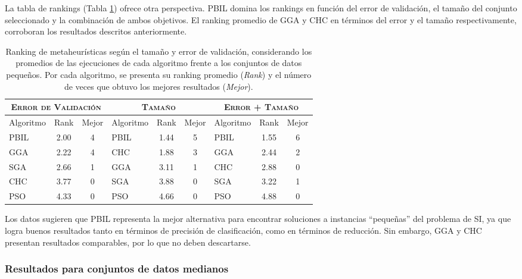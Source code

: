 La tabla de rankings (Tabla \ref{res-small-rank}) ofrece otra perspectiva. PBIL domina los rankings en función del error de validación, el tamaño del conjunto seleccionado y la combinación de ambos objetivos. El ranking promedio de GGA y CHC en términos del error y el tamaño respectivamente, corroboran los resultados descritos anteriormente.

\begin{table}[h!]
\centering
\begin{tabular}{l c c|l c c|l c c}
\hline
\multicolumn{3}{c|}{\textsc{Error de Validación}}
	& \multicolumn{3}{c|}{\textsc{Tamaño}}
	& \multicolumn{3}{c}{\textsc{Error + Tamaño}} \\
\hline
Algoritmo & Rank & Mejor & Algoritmo & Rank & Mejor & Algoritmo & Rank & Mejor \\
\hline
\hline
PBIL & 2.00 & 4 & PBIL & 1.44 & 5 & PBIL & 1.55 & 6 \\
GGA  & 2.22 & 4 & CHC  & 1.88 & 3 & GGA  & 2.44 & 2 \\
SGA  & 2.66 & 1 & GGA  & 3.11 & 1 & CHC  & 2.88 & 0 \\
CHC  & 3.77 & 0 & SGA  & 3.88 & 0 & SGA  & 3.22 & 1 \\
PSO  & 4.33 & 0 & PSO  & 4.66 & 0 & PSO  & 4.88 & 0 \\
\hline
\end{tabular}
\caption[Ranking de metaheurísticas usando conjuntos de datos pequeños]{Ranking de metaheurísticas según el tamaño y error de validación, considerando los promedios de las ejecuciones de cada algoritmo frente a los conjuntos de datos pequeños. Por cada algoritmo, se presenta su ranking promedio (\emph{Rank}) y el número de veces que obtuvo los mejores resultados (\emph{Mejor}).}
\label{res-small-rank}
\end{table}

Los datos sugieren que PBIL representa la mejor alternativa para encontrar soluciones a instancias ``pequeñas'' del problema de SI, ya que logra buenos resultados tanto en términos de precisión de clasificación, como en términos de reducción. Sin embargo, GGA y CHC presentan resultados comparables, por lo que no deben descartarse.

\subsubsection{Resultados para conjuntos de datos medianos}

